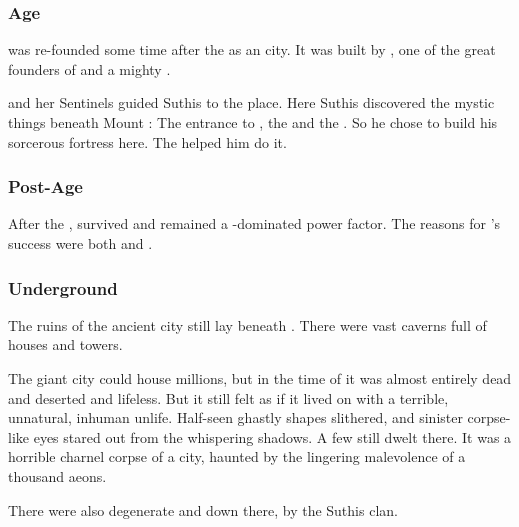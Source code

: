 \subsubsection{\Ortaican Age}
\Yormis was re-founded some time after the  as an \Ortaican city. 
It was built by , one of the great founders of \Ortaica and a mighty . 

\Thessulax and her Sentinels guided Suthis to the place. 
Here Suthis discovered the mystic things beneath Mount \Shrun:
The entrance to \KaiLeng, the \xs \Ubloth and the . 
So he chose to build his sorcerous fortress here. 
The \ophidians helped him do it. 





\subsubsection{Post-\Ortaican Age}
After the , \Yormis survived and remained a \rethyax-dominated power factor. 
The reasons for \Yormis's success were both  and . 





\subsubsection{Underground}
The ruins of the ancient \ophidian city still lay beneath \Yormis.
There were vast caverns full of houses and towers. 

The giant city could house millions, but in the time of \MoroCobrel it was almost entirely dead and deserted and lifeless.
But it still felt as if it lived on with a terrible, unnatural, inhuman unlife. 
Half-seen ghastly shapes slithered, and sinister corpse-like eyes stared out from the whispering shadows.
A few \ophidians still dwelt there.
It was a horrible charnel corpse of a city, haunted by the lingering malevolence of a thousand aeons. 

There were also degenerate \scathae and \humans down there,  by the Suthis clan. 










